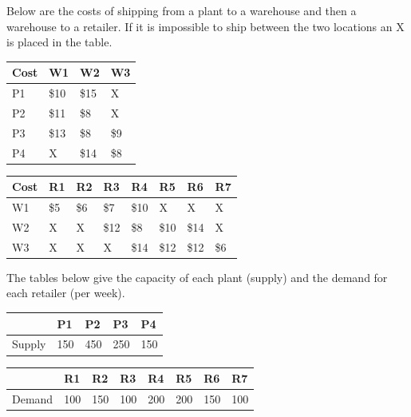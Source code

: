 \documentclass{article}
\begin{document}
Below are the costs of shipping from a plant to a warehouse and then a warehouse to a retailer. If it is impossible to ship between the two locations an X is placed in the table.\\

\begin{flushleft}
 \begin{tabular}{|| l | l | l | l ||}
 \hline
 Cost & W1 & W2 & W3\\ 
 \hline\hline
 P1 & \$10 & \$15 & X\\ 
 \hline
 P2 & \$11 & \$8 & X\\ 
 \hline
 P3 & \$13 & \$8 & \$9\\  
 \hline
 P4 & X & \$14 & \$8\\  
 \hline
\end{tabular}
\end{flushleft}

\begin{flushleft}
 \begin{tabular}{|| l | l | l | l | l | l | l  | l ||}
 \hline
 Cost & R1 & R2 & R3 & R4 & R5 & R6 & R7\\ 
 \hline\hline
 W1 & \$5 & \$6 & \$7 & \$10 & X & X & X\\ 
 \hline
 W2 & X & X & \$12 & \$8 & \$10 & \$14 & X\\ 
 \hline
 W3 & X & X & X & \$14 & \$12 & \$12 & \$6\\ 
 \hline
\end{tabular}
\end{flushleft}

\noindent The tables below give the capacity of each plant (supply) and the demand for each retailer (per week).

\begin{flushleft}
 \begin{tabular}{|| l | l | l | l | l ||}
 \hline
  & P1 & P2 & P3 & P4\\ 
 \hline\hline
 Supply & 150 & 450 & 250 & 150\\ 
 \hline
\end{tabular}
\end{flushleft}

\begin{flushleft}
 \begin{tabular}{|| l | l | l | l | l | l | l | l ||}
 \hline
 & R1 & R2 & R3 & R4 & R5 & R6 & R7\\ 
 \hline\hline
 Demand & 100 & 150 & 100 & 200 & 200 & 150 & 100\\ 
 \hline
\end{tabular}
\end{flushleft}
\end{document}
